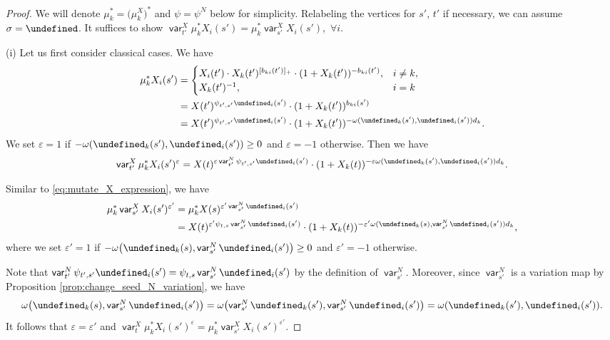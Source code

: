 \documentclass[10pt,a4paper]{amsart}
\newcommand{\opname}[1]{\operatorname{\mathsf{#1}}}
\newcommand{\var}{\opname{var}}
\let\Id\undefined
\let\ee\undefined
\newcommand{\Id}{{\opname{Id}}}
\newcommand{\ee}{\mathbf{e}}
\numberwithin{equation}{section}
\begin{document}
\begin{proof}
 We will denote $\mu_{k}^{*}=\big(\mu_{k}^{X}\big)^{*}$ and $\psi=\psi^N$ below for simplicity. Relabeling the vertices for $s'$, $t'$ if necessary, we can
assume $\sigma=\Id$. It suffices to show $\var_{t'}^{X}\mu_{k}^{*}X_{i}(s')=\mu_{k}^{*}\var_{s'}^{X}X_{i}(s')$,~$\forall i$.

(i) Let us first consider classical cases. We have
\begin{align}
\mu_{k}^{*}X_{i}(s') & =\begin{cases}
X_{i}(t')\cdot X_{k}(t')^{[b_{ki}(t')]_{+}}\cdot(1+X_{k}(t'))^{-b_{ki}(t')}, & i\neq k,\\
X_{k}(t')^{-1}, & i=k
\end{cases} \nonumber\\
 & =X(t')^{\psi_{t',s'}\ee_{i}(s')}\cdot(1+X_{k}(t'))^{b_{ki}(s')}\nonumber \\
 & =X(t')^{\psi_{t',s'}\ee_{i}(s')}\cdot(1+X_{k}(t'))^{-\omega(\ee_{k}(s'),\ee_{i}(s'))d_{k}}. \label{eq:mutate_X_expression}
\end{align}
We set $\varepsilon=1$ if $-\omega(\ee_{k}(s'),\ee_{i}(s'))\geq 0$ and $\varepsilon=-1$ otherwise. Then we have
\begin{align}\label{eq:var_mu_X}
 \var_{t'}^{X}\mu_{k}^{*}X_{i}(s')^\varepsilon=X(t)^{\varepsilon\var_{t'}^{N}\psi_{t',s'}\ee_{i}(s')}\cdot(1+X_{k}(t))^{-\varepsilon\omega(\ee_{k}(s'),\ee_{i}(s'))d_{k}}.
\end{align}

Similar to \eqref{eq:mutate_X_expression}, we have
\begin{align}\label{eq:mu_var_X}
\mu_{k}^{*}\var_{s'}^{X}X_{i}(s')^{{\varepsilon'}} & =\mu_{k}^{*}X(s)^{{\varepsilon'}\var_{s'}^{N}\ee_{i}(s')} \nonumber\\
 & =X(t)^{{\varepsilon'}\psi_{t,s}\var_{s'}^{N}\ee_{i}(s')}\cdot (1+X_{k}(t))^{-{\varepsilon'}\omega(\ee_{k}(s),\var_{s'}^{N}\ee_{i}(s'))d_{k}},
\end{align}
where we set $\varepsilon'=1$ if $-\omega\big(\ee_{k}(s),\var_{s'}^{N}\ee_{i}(s')\big)\geq 0$ and $\varepsilon'=-1$ otherwise.

Note that $\var_{t'}^{N}\psi_{t',s'}\ee_{i}(s')=\psi_{t,s}\var_{s'}^{N}\ee_{i}(s')$
by the definition of $\var_{s'}^{N}$. Moreover, since $\var_{s'}^{N}$
is a variation map by Proposition \ref{prop:change_seed_N_variation},
we have \[\omega\big(\ee_{k}(s),\var_{s'}^{N}\ee_{i}(s')\big)=\omega\bigl(\var_{s'}^{N}\ee_{k}(s'),\var_{s'}^{N}\ee_{i}(s')\bigr)=\omega(\ee_{k}(s'),\ee_{i}(s')).\]
It follows that $\varepsilon=\varepsilon'$ and $\var_{t}^{X}\mu_{k}^{*}X_{i}(s')^{\varepsilon}=\mu_{k}^{*}\var_{s'}^{X}X_{i}(s')^{{\varepsilon'}}$.


\end{proof}
\end{document}
